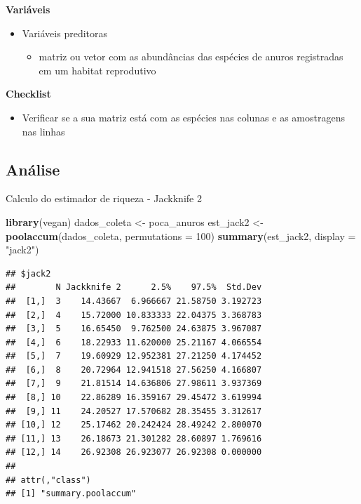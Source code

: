 \documentclass[
]{book}
\newenvironment{Shaded}{\begin{snugshade}}{\end{snugshade}}
\newcommand{\DataTypeTok}[1]{\textcolor[rgb]{0.13,0.29,0.53}{#1}}
\newcommand{\DecValTok}[1]{\textcolor[rgb]{0.00,0.00,0.81}{#1}}
\newcommand{\KeywordTok}[1]{\textcolor[rgb]{0.13,0.29,0.53}{\textbf{#1}}}
\newcommand{\NormalTok}[1]{#1}
\newcommand{\StringTok}[1]{\textcolor[rgb]{0.31,0.60,0.02}{#1}}
\providecommand{\tightlist}{%
  \setlength{\itemsep}{0pt}\setlength{\parskip}{0pt}}
\begin{document}
\textbf{Variáveis}

\begin{itemize}
\tightlist
\item
  Variáveis preditoras

  \begin{itemize}
  \tightlist
  \item
    matriz ou vetor com as abundâncias das espécies de anuros registradas em um habitat reprodutivo
  \end{itemize}
\end{itemize}

\textbf{Checklist}

\begin{itemize}
\tightlist
\item
  Verificar se a sua matriz está com as espécies nas colunas e as amostragens nas linhas
\end{itemize}

\hypertarget{anuxe1lise-4}{%
\subsection{Análise}\label{anuxe1lise-4}}

Calculo do estimador de riqueza - Jackknife 2

\begin{Shaded}
\begin{Highlighting}[]
\KeywordTok{library}\NormalTok{(vegan)}
\NormalTok{dados_coleta <-}\StringTok{ }\NormalTok{poca_anuros}
\NormalTok{est_jack2 <-}\StringTok{ }\KeywordTok{poolaccum}\NormalTok{(dados_coleta, }\DataTypeTok{permutations =} \DecValTok{100}\NormalTok{)}
\KeywordTok{summary}\NormalTok{(est_jack2, }\DataTypeTok{display =} \StringTok{"jack2"}\NormalTok{)}
\end{Highlighting}
\end{Shaded}

\begin{verbatim}
## $jack2
##        N Jackknife 2      2.5%    97.5%  Std.Dev
##  [1,]  3    14.43667  6.966667 21.58750 3.192723
##  [2,]  4    15.72000 10.833333 22.04375 3.368783
##  [3,]  5    16.65450  9.762500 24.63875 3.967087
##  [4,]  6    18.22933 11.620000 25.21167 4.066554
##  [5,]  7    19.60929 12.952381 27.21250 4.174452
##  [6,]  8    20.72964 12.941518 27.56250 4.166807
##  [7,]  9    21.81514 14.636806 27.98611 3.937369
##  [8,] 10    22.86289 16.359167 29.45472 3.619994
##  [9,] 11    24.20527 17.570682 28.35455 3.312617
## [10,] 12    25.17462 20.242424 28.49242 2.800070
## [11,] 13    26.18673 21.301282 28.60897 1.769616
## [12,] 14    26.92308 26.923077 26.92308 0.000000
## 
## attr(,"class")
## [1] "summary.poolaccum"
\end{verbatim}
\end{document}
